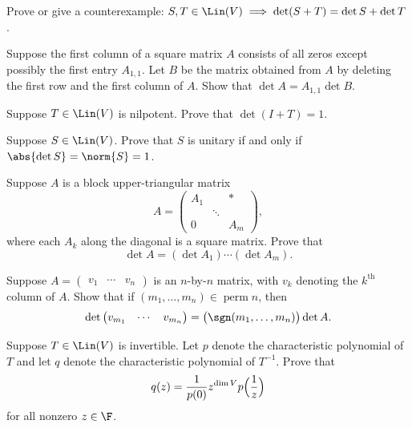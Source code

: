 \begin{exc}

\begin{exercise}
Prove or give a counterexample: $S,T\in\Lin(V)\implies
\det(S+T)=\det S+\det T$.
\end{exercise}

\begin{exercise}
Suppose the first column of a square matrix $A$ consists of all zeros except
possibly the first entry $A_{1,1}$. Let $B$ be the matrix obtained from $A$ by
deleting the first row and the first column of $A$. Show that
$\det A=A_{1,1}\det B$.
\end{exercise}

\begin{exercise}
Suppose $T\in\Lin(V)$ is nilpotent. Prove that $\det(I+T)=1$.
\end{exercise}

\begin{exercise}
Suppose $S\in\Lin(V)$. Prove that $S$ is unitary if and only if
$\abs{\det S}=\norm{S}=1$.
\end{exercise}

\begin{exercise}
Suppose $A$ is a block upper-triangular matrix
\[ A = \begin{pmatrix}
       A_1 &        & *\\
           & \ddots &  \\
       0   &        & A_m
       \end{pmatrix}, \]
where each $A_k$ along the diagonal is a square matrix. Prove that
\[ \det A = (\det A_1)\cdots(\det A_m). \]
\end{exercise}

\begin{exercise}
Suppose $A=\begin{pmatrix} v_1 & \cdots & v_n \end{pmatrix}$ is an $n$-by-$n$
matrix, with $v_k$ denoting the $k^{\text{th}}$ column of $A$. Show that if
$(m_1,\dots,m_n)\in\operatorname{perm} n$, then
\[ \det\begin{pmatrix} v_{m_1} & \cdots & v_{m_n} \end{pmatrix}
   = \bigl(\sgn(m_1,\dots,m_n)\bigr)\det A. \]
\end{exercise}

\begin{exercise}
Suppose $T\in\Lin(V)$ is invertible. Let $p$ denote the characteristic
polynomial of $T$ and let $q$ denote the characteristic polynomial of $T^{-1}$.
Prove that
\[ q(z) = \frac{1}{p(0)}z^{\dim V}p\Bigl(\frac{1}{z}\Bigr) \]
for all nonzero $z\in\F$.
\end{exercise}


\end{exc}
